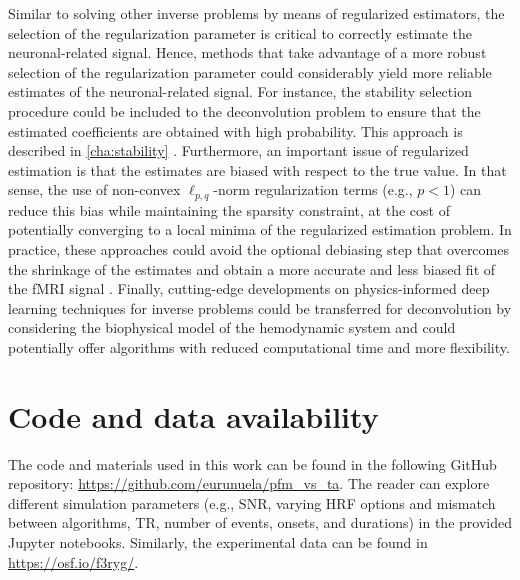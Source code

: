 Similar to solving other inverse problems by means of regularized estimators,
the selection of the regularization parameter is critical to correctly estimate
the neuronal-related signal. Hence, methods that take advantage of a more robust
selection of the regularization parameter could considerably yield more reliable
estimates of the neuronal-related signal. For instance, the stability selection
procedure
\citep{Meinshausen2010Stabilityselection,Urunuela2020StabilityBasedSparse}could
be included to the deconvolution problem to ensure that the estimated
coefficients are obtained with high probability. This approach is described in
\cref{cha:stability} \citep{Urunuela2020StabilityBasedSparse}. Furthermore, an
important issue of regularized estimation is that the estimates are biased with
respect to the true value. In that sense, the use of non-convex
\(\ell_{p,q}\)-norm regularization terms (e.g., \(p < 1\)) can reduce this bias
while maintaining the sparsity constraint, at the cost of potentially converging
to a local minima of the regularized estimation problem. In practice, these
approaches could avoid the optional debiasing step that overcomes the shrinkage
of the estimates and obtain a more accurate and less biased fit of the fMRI
signal
\citep{Gaudes2013Paradigmfreemapping,CaballeroGaudes2019deconvolutionalgorithmmulti}.
Finally, cutting-edge developments on physics-informed deep learning techniques
for inverse problems
\citep{Akcakaya2021UnsupervisedDeepLearning,Monga2021AlgorithmUnrollingInterpretable,Ongie2020DeepLearningTechniques,Cherkaoui2020LearningsolveTV}
could be transferred for deconvolution by considering the biophysical model of
the hemodynamic system and could potentially offer algorithms with reduced
computational time and more flexibility.

\section{Code and data availability}
\label{sec:synthesis_github}
The code and materials used in this work can be found in the following GitHub
repository: \url{https://github.com/eurunuela/pfm_vs_ta}. The reader can explore
different simulation parameters (e.g., SNR, varying HRF options and mismatch
between algorithms, TR, number of events, onsets, and durations) in the provided
Jupyter notebooks. Similarly, the experimental data can be found in
\url{https://osf.io/f3ryg/}.